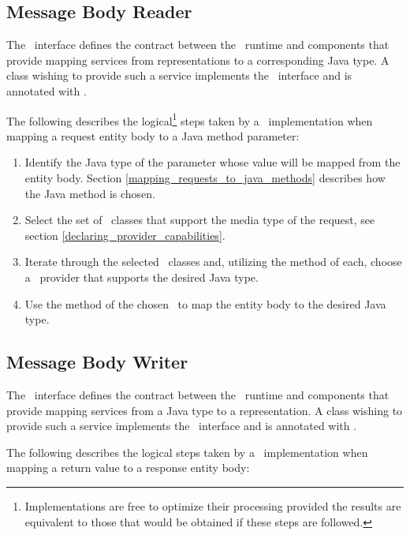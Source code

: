\subsection{Message Body Reader}
\label{message_body_reader}

The \MsgRead\ interface defines the contract between the \jaxrs\ runtime and components that provide mapping services from representations to a corresponding Java type. A class wishing to provide such a service implements the \MsgRead\ interface and is annotated with \Provider.

The following describes the logical\footnote{Implementations are free to optimize their processing provided the results are equivalent to those that would be obtained if these steps are followed.} steps taken by a \jaxrs\ implementation when mapping a request entity body to a Java method parameter:

\begin{enumerate}
\item Identify the Java type of the parameter whose value will be mapped from the entity body. Section \ref{mapping_requests_to_java_methods} describes how the Java method is chosen.
\item Select the set of \MsgRead\ classes that support the media type of the request, see section \ref{declaring_provider_capabilities}.
\item Iterate through the selected \MsgRead\ classes and, utilizing the  method of each, choose a \MsgRead\ provider that supports the desired Java type.
\item Use the  method of the chosen \MsgRead\ to map the entity body to the desired Java type.
\end{enumerate}

\subsection{Message Body Writer}
\label{message_body_writer}

The \MsgWrite\ interface defines the contract between the \jaxrs\ runtime and components that provide mapping services from a Java type to a representation. A class wishing to provide such a service implements the \MsgWrite\ interface and is annotated with \Provider.

The following describes the logical steps taken by a \jaxrs\ implementation when mapping a return value to a response entity body:


